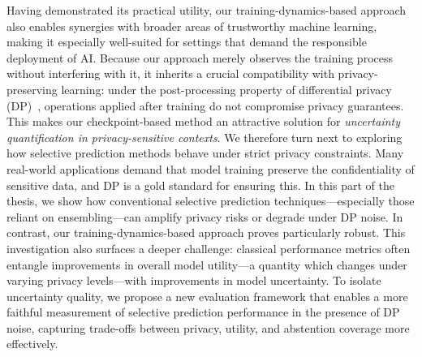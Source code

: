 Having demonstrated its practical utility, our training-dynamics-based approach also enables synergies with broader areas of trustworthy machine learning, making it especially well-suited for settings that demand the responsible deployment of AI. Because our approach merely observes the training process without interfering with it, it inherits a crucial compatibility with privacy-preserving learning: under the post-processing property of differential privacy (DP)~\citep{dwork2006calibrating}, operations applied after training do not compromise privacy guarantees. This makes our checkpoint-based method an attractive solution for \emph{uncertainty quantification in privacy-sensitive contexts}. We therefore turn next to exploring how selective prediction methods behave under strict privacy constraints. Many real-world applications demand that model training preserve the confidentiality of sensitive data, and DP is a gold standard for ensuring this. In this part of the thesis, we show how conventional selective prediction techniques—especially those reliant on ensembling—can amplify privacy risks or degrade under DP noise. In contrast, our training-dynamics-based approach proves particularly robust. This investigation also surfaces a deeper challenge: classical performance metrics often entangle improvements in overall model utility---a quantity which changes under varying privacy levels---with improvements in model uncertainty. To isolate uncertainty quality, we propose a new evaluation framework that enables a more faithful measurement of selective prediction performance in the presence of DP noise, capturing trade-offs between privacy, utility, and abstention coverage more effectively.

